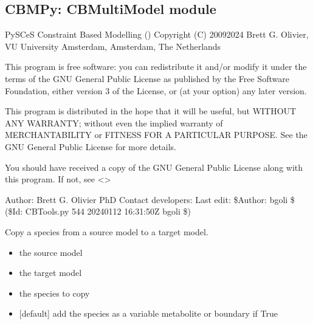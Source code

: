 \documentclass[letterpaper,12pt,english]{sphinxmanual}
\begin{document}
\subsection{CBMPy: CBMultiModel module}
\label{\detokenize{api/visualization:cbmpy-cbmultimodel-module}}\label{\detokenize{api/visualization:module-cbmpy.CBMultiModel}}
\sphinxAtStartPar
PySCeS Constraint Based Modelling ()
Copyright (C) 2009\sphinxhyphen{}2024 Brett G. Olivier, VU University Amsterdam, Amsterdam, The Netherlands

\sphinxAtStartPar
This program is free software: you can redistribute it and/or modify
it under the terms of the GNU General Public License as published by
the Free Software Foundation, either version 3 of the License, or
(at your option) any later version.

\sphinxAtStartPar
This program is distributed in the hope that it will be useful,
but WITHOUT ANY WARRANTY; without even the implied warranty of
MERCHANTABILITY or FITNESS FOR A PARTICULAR PURPOSE.  See the
GNU General Public License for more details.

\sphinxAtStartPar
You should have received a copy of the GNU General Public License
along with this program.  If not, see \textless{}\textgreater{}

\sphinxAtStartPar
Author: Brett G. Olivier PhD
Contact developers: 
Last edit: \$Author: bgoli \$ (\$Id: CBTools.py 544 2024\sphinxhyphen{}01\sphinxhyphen{}12 16:31:50Z bgoli \$)

\begin{fulllineitems}
\label{\detokenize{api/visualization:cbmpy.CBMultiModel.copySpecies}}
\pysigstartsignatures
\pysiglinewithargsret
{}
{\sphinxparamcomma {}\sphinxparamcomma {}\sphinxparamcomma {}}
{}
\pysigstopsignatures
\sphinxAtStartPar
Copy a species from a source model to a target model.
\begin{itemize}
\item {} 
\sphinxAtStartPar
{} the source model

\item {} 
\sphinxAtStartPar
{} the target model

\item {} 
\sphinxAtStartPar
{} the species to copy

\item {} 
\sphinxAtStartPar
{} {[}default{]} add the species as a variable metabolite or boundary if True

\end{itemize}

\end{fulllineitems}
\end{document}
